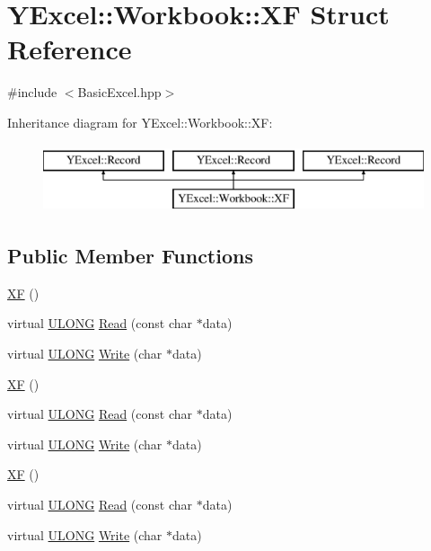 \hypertarget{struct_y_excel_1_1_workbook_1_1_x_f}{}\section{Y\+Excel\+:\+:Workbook\+:\+:X\+F Struct Reference}
\label{struct_y_excel_1_1_workbook_1_1_x_f}


{\ttfamily \#include $<$Basic\+Excel.\+hpp$>$}

Inheritance diagram for Y\+Excel\+:\+:Workbook\+:\+:X\+F\+:\begin{figure}[H]
\begin{center}
\leavevmode
\includegraphics[height=2.000000cm]{struct_y_excel_1_1_workbook_1_1_x_f}
\end{center}
\end{figure}
\subsection*{Public Member Functions}
\begin{DoxyCompactItemize}
\item 
\hyperlink{struct_y_excel_1_1_workbook_1_1_x_f_a8517f66800fdbf4fd22ee70cb9180ccc}{X\+F} ()
\item 
virtual \hyperlink{_basic_excel_8hpp_abe09d1bea023be6a07cbadde8e955435}{U\+L\+O\+N\+G} \hyperlink{struct_y_excel_1_1_workbook_1_1_x_f_a2506424428a249f669e7b2e1511d073c}{Read} (const char $\ast$data)
\item 
virtual \hyperlink{_basic_excel_8hpp_abe09d1bea023be6a07cbadde8e955435}{U\+L\+O\+N\+G} \hyperlink{struct_y_excel_1_1_workbook_1_1_x_f_ab0ef620b50fb7d6f28f18b27de2d36b7}{Write} (char $\ast$data)
\item 
\hyperlink{struct_y_excel_1_1_workbook_1_1_x_f_a8517f66800fdbf4fd22ee70cb9180ccc}{X\+F} ()
\item 
virtual \hyperlink{_basic_excel_8hpp_abe09d1bea023be6a07cbadde8e955435}{U\+L\+O\+N\+G} \hyperlink{struct_y_excel_1_1_workbook_1_1_x_f_ac5fa9dd4cbc19531afb7633cb189ac73}{Read} (const char $\ast$data)
\item 
virtual \hyperlink{_basic_excel_8hpp_abe09d1bea023be6a07cbadde8e955435}{U\+L\+O\+N\+G} \hyperlink{struct_y_excel_1_1_workbook_1_1_x_f_aa3de875187a0241f8e5228a15fe14c21}{Write} (char $\ast$data)
\item 
\hyperlink{struct_y_excel_1_1_workbook_1_1_x_f_a8517f66800fdbf4fd22ee70cb9180ccc}{X\+F} ()
\item 
virtual \hyperlink{_basic_excel_8hpp_abe09d1bea023be6a07cbadde8e955435}{U\+L\+O\+N\+G} \hyperlink{struct_y_excel_1_1_workbook_1_1_x_f_ac5fa9dd4cbc19531afb7633cb189ac73}{Read} (const char $\ast$data)
\item 
virtual \hyperlink{_basic_excel_8hpp_abe09d1bea023be6a07cbadde8e955435}{U\+L\+O\+N\+G} \hyperlink{struct_y_excel_1_1_workbook_1_1_x_f_aa3de875187a0241f8e5228a15fe14c21}{Write} (char $\ast$data)
\end{DoxyCompactItemize}
